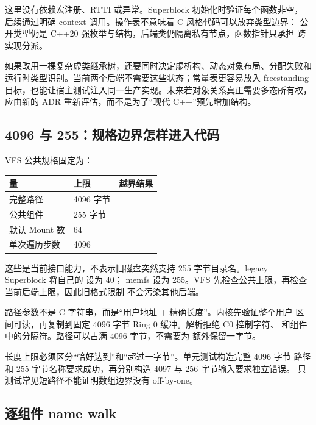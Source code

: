 这里没有依赖宏注册、RTTI 或异常。Superblock 初始化时验证每个函数非空，
后续通过明确 context 调用。操作表不意味着 C 风格代码可以放弃类型边界：
公开类型仍是 C++20 强枚举与结构，后端类仍隔离私有节点，函数指针只承担
跨实现分派。

如果改用一棵复杂虚类继承树，还要同时决定虚析构、动态对象布局、分配失败和
运行时类型识别。当前两个后端不需要这些状态；常量表更容易放入 freestanding
目标，也能让宿主测试注入同一生产实现。未来若对象关系真正需要多态所有权，
应由新的 ADR 重新评估，而不是为了“现代 C++”预先增加结构。

\subsection{4096 与 255：规格边界怎样进入代码}

VFS 公共规格固定为：

\begin{longtable}{L{0.33\textwidth}L{0.20\textwidth}L{0.35\textwidth}}
\toprule
量 & 上限 & 越界结果\\
\midrule
完整路径 & 4096 字节 & \\
公共组件 & 255 字节 & \\
默认 Mount 数 & 64 & \\
单次遍历步数 & 4096 & \\
\bottomrule
\end{longtable}

这些是当前接口能力，不表示旧磁盘突然支持 255 字节目录名。legacy
Superblock 将自己的  设为 40；
memfs 设为 255。VFS 先检查公共上限，再检查当前后端上限，因此旧格式限制
不会污染其他后端。

路径参数不是 C 字符串，而是“用户地址 + 精确长度”。内核先验证整个用户
区间可读，再复制到固定 4096 字节 Ring 0 缓冲。解析拒绝 C0 控制字符、
 和组件中的分隔符。路径可以占满 4096 字节，不需要为
 额外保留一字节。

\begin{contractbox}
长度上限必须区分“恰好达到”和“超过一字节”。单元测试构造完整 4096 字节
路径和 255 字节名称要求成功，再分别构造 4097 与 256 字节输入要求独立错误。
只测试常见短路径不能证明数组边界没有 off-by-one。
\end{contractbox}

\subsection{逐组件 name walk}


